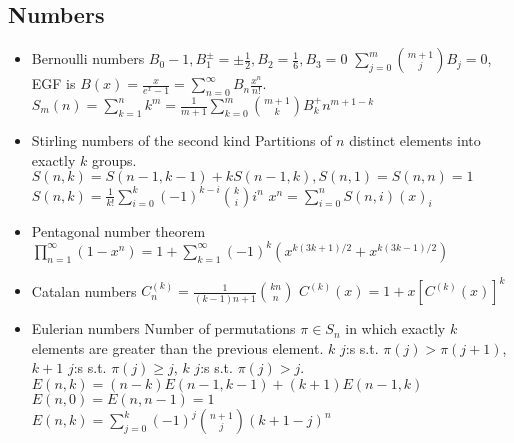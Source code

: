 \documentclass[10pt, a4paper, twocolumn, oneside]{article}
\begin{document}
\subsection{Numbers}
\begin{itemize}
\item Bernoulli numbers
$B_0-1,B_1^{\pm}=\pm\frac{1}{2},B_2=\frac{1}{6},B_3=0$
$\displaystyle\sum_{j=0}^m\binom{m+1}{j}B_j=0$, EGF is $B(x) = \frac{x}{e^x - 1}=\displaystyle\sum_{n=0}^\infty B_n\frac{x^n}{n!}$.
$S_m(n)=\displaystyle\sum_{k=1}^nk^m=\frac{1}{m+1}\sum_{k=0}^m\binom{m+1}{k}B^{+}_kn^{m+1-k}$
\item Stirling numbers of the second kind
Partitions of $n$ distinct elements into exactly $k$ groups. 
$S(n, k) = S(n - 1, k - 1) + kS(n - 1, k), S(n, 1) = S(n, n) = 1$
$S(n, k) = \frac{1}{k!}\sum_{i=0}^{k}(-1)^{k-i}{k \choose i}i^n$
$x^n     = \sum_{i=0}^{n} S(n, i) (x)_i$
\item Pentagonal number theorem
$\displaystyle\prod_{n=1}^{\infty}(1-x^n)=1+\sum_{k=1}^{\infty}(-1)^k\left(x^{k(3k+1)/2} + x^{k(3k-1)/2}\right)$
\item Catalan numbers
$C^{(k)}_n = \displaystyle \frac{1}{(k - 1)n + 1}\binom{kn}{n}$
$C^{(k)}(x) = 1 + x [C^{(k)}(x)]^k$
\item Eulerian numbers
Number of permutations $\pi \in S_n$ in which exactly $k$ elements are greater than the previous element. $k$ $j$:s s.t. $\pi(j)>\pi(j+1)$, $k+1$ $j$:s s.t. $\pi(j)\geq j$, $k$ $j$:s s.t. $\pi(j)>j$.
$E(n,k) = (n-k)E(n-1,k-1) + (k+1)E(n-1,k)$
$E(n,0) = E(n,n-1) = 1$
$E(n,k) = \sum_{j=0}^k(-1)^j\binom{n+1}{j}(k+1-j)^n$
\end{itemize}
\end{document}
